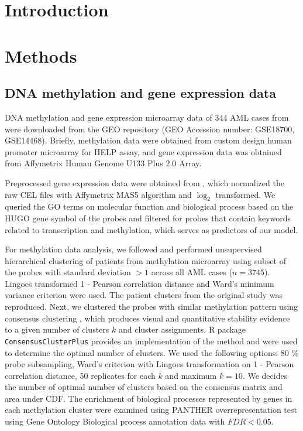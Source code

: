 \documentclass{article}
\begin{document}
\section{Introduction}



\section{Methods}


\subsection{\citet{figueroa2010dna} DNA methylation and gene expression data}

DNA methylation and gene expression microarray data of 344 AML cases from \citet{figueroa2010dna} were downloaded from the GEO repository (GEO Accession number: GSE18700, GSE14468). Briefly, methylation data were obtained from custom design human promoter microarray for HELP assay, and gene expression data was obtained from Affymetrix Human Genome U133 Plus 2.0 Array. 

Preprocessed gene expression data were obtained from \citet{gentles2015prognostic}, which normalized the raw CEL files with Affymetrix MAS5 algorithm and $\log_2$ transformed. We queried the GO terms on molecular function and biological process based on the HUGO gene symbol of the probes and filtered for probes that contain keywords related to transcription and methylation, which serves as predictors of our model.

For methylation data analysis, we followed \citet{figueroa2010dna} and performed unsupervised hierarchical clustering of patients from methylation microarray using subset of the probes with standard deviation $> 1$ across all AML cases ($n = 3745$). Lingoes transformed 1 - Pearson correlation distance and Ward's minimum variance criterion were used. The patient clusters from the original study was reproduced. Next, we clustered the probes with similar methylation pattern using consensus clustering \citep{monti2003consensus}, which produces visual and quantitative stability evidence to a given number of clusters $k$ and cluster assignments. R package \texttt{ConsensusClusterPlus} \citep{wilkerson2010consensusclusterplus} provides an implementation of the method and were used to determine the optimal number of clusters. We used the following options: 80 \% probe subsampling, Ward's criterion with Lingoes transformation on 1 - Pearson correlation distance, 50 replicates for each $k$  and maximum $k = 10$.  We decides the number of optimal number of clusters based on the consensus matrix and area under CDF. The enrichment of biological processes represented by genes in each methylation cluster were examined using PANTHER overrepresentation test using Gene Ontology Biological process annotation data \citep{mi2013large} with $ FDR < 0.05$.
\end{document}
